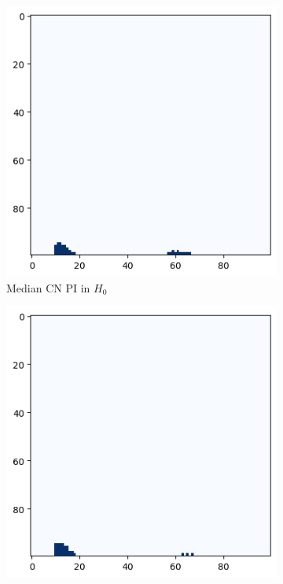 \documentclass{article}
\begin{document}
\begin{figure}
  \centering
  \centering
  \begin{subfigure}{0.32\textwidth}
    \includegraphics[width=\textwidth]{figures/median_pls/median_pi_CN_h_0.png}
    \caption{Median CN PI in $H_0$}
  \end{subfigure}
  \begin{subfigure}{0.32\textwidth}
    \includegraphics[width=\textwidth]{figures/median_pls/median_pi_MCI_h_0.png}

\end{subfigure}
\end{figure}
\end{document}
